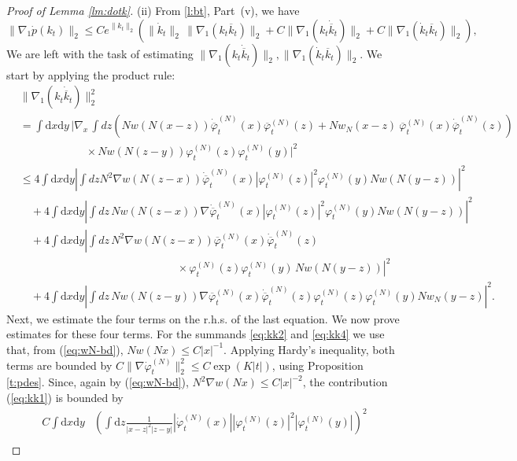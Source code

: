 \documentclass[11pt,a4paper]{article}
\newcommand{\di}{\textrm{d}}		%
\newcommand{\cc}[1]{\overline{#1}}	%
\newcommand{\norm}[1]{\lVert#1\rVert}	%
\newcommand{\ph}{\varphi_t^{(N)}}	%
\newcommand{\phdot}{\dot{\varphi}_t^{(N)}}	%
\begin{document}
\begin{proof}[Proof of Lemma \ref{lm:dotk}]
(ii) {F}rom \ref{l:bt}, Part~(v), we have
\[\| \nabla_1 \dot p (k_t) \|_2 \leq C e^{\| k_t \|_2} \left( \| \dot k_t \|_2 \,  \| \nabla_1 (k_t \overline{k}_t) \|_2 + C \| \nabla_1 (k_t \dot{\overline{k}}_t) \|_2  + C \| \nabla_1 (\dot k_t \overline{k}_t) \|_2 \right) , \]
We are left with the task of estimating $\| \nabla_1 (k_t \dot{\overline{k}}_t) \|_2, \| \nabla_1 (\dot k_t \overline{k}_t) \|_2$. We start by applying the product rule:
\begin{align}
& \norm{\nabla_1 (k_t \dot{\overline{k}}_t)}_2^2  \nonumber \\
& = \int \di x \di y \, \bigg\lvert \nabla_x \, \int dz \left( N w(N(x-z)) \dot{\cc{\varphi}}_t^{(N)} (x) \cc{\varphi}_t^{(N)} (z) + N w_N(x-z)\ \cc{\varphi}_t^{(N)} (x) \dot{\cc{\varphi}}_t^{(N)} (z) \right) \nonumber \\
& \qquad\qquad\qquad \times N w(N(z-y)) {\ph(z)} {\ph(y)} \bigg\rvert^2 \nonumber \\
& \leq 4 \int \di x \di y \left\lvert \int dz N^2 \nabla w (N(z-x)) \dot{\cc{\varphi}}_t^{(N)} (x)  |\ph(z)|^2  \ph(y) N w (N(y-z)) \right|^2 \label{eq:kk1} \\
& \quad + 4 \int \di x \di y \left| \int dz \, N w (N(z-x)) \nabla \dot{\cc{\varphi}}_t^{(N)} (x) |\ph(z)|^2 \ph(y) N w (N(y-z)) \right|^2 \label{eq:kk2}\\
& \quad + 4 \int \di x \di y \left| \int dz \, N^2 \nabla w (N(z-x)) \cc{\varphi}_t^{(N)} (x) \dot{\cc{\varphi}}_t^{(N)} (z) \right. \nonumber \\ & \left. \hspace{6cm} \times \ph(z)  \ph(y) \, N w (N(y-z)) \right|^2 \label{eq:kk3}\\
& \quad + 4 \int \di x \di y \left| \int dz \, N w(N(z-y)) \nabla \cc{\varphi}_t^{(N)} (x) \dot{\cc{\varphi}}_t^{(N)} (z) \ph(z) \ph(y) N w_N(y-z) \right|^2. \label{eq:kk4}
\end{align}
Next, we estimate the four terms on the r.h.s. of the last equation. 
We now prove estimates for these four terms. For the summands \eqref{eq:kk2} and \eqref{eq:kk4} we use that, from (\ref{eq:wN-bd}), $N w(Nx) \leq C |x|^{-1}$. Applying Hardy's inequality, both terms are bounded by $C \norm{\nabla \phdot}_{2}^2 \leq C \exp (K |t|)$, using Proposition \ref{t:pdes}. Since, again by (\ref{eq:wN-bd}), $N^2 \nabla w (Nx)\leq C |x|^{-2}$, the contribution (\ref{eq:kk1}) is bounded by 
\begin{align*}
C \int \di x \di y &\left( \int \di z \frac{1}{|x-z|^2 |z-y|} |\dot{\varphi}_t^{(N)} (x)| |\ph(z)|^2 |\ph(y)|  \right)^2 \\

\end{align*}
\end{proof}
\end{document}
